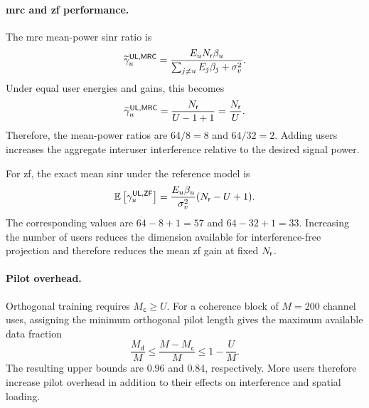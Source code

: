 \paragraph{\ac{mrc} and \ac{zf} performance.}
The \ac{mrc} mean-power \ac{sinr} ratio is
\begin{equation*}
	\widetilde\gamma_u^{\mathsf{UL},\mathsf{MRC}}
	=\frac{E_uN_{\mathsf{r}}\beta_u}
	{\sum_{j\ne u}E_j\beta_j+\sigma_v^2}.
\end{equation*}
Under equal user energies and gains, this becomes
\begin{equation*}
	\widetilde\gamma_u^{\mathsf{UL},\mathsf{MRC}}
	=\frac{N_{\mathsf{r}}}{U-1+1}
	=\frac{N_{\mathsf{r}}}{U}.
\end{equation*}
Therefore, the mean-power ratios are $64/8=8$ and $64/32=2$. Adding users increases the aggregate interuser interference relative to the desired signal power.

For \ac{zf}, the exact mean \ac{sinr} under the reference model is
\begin{equation*}
	\mathbb{E}\left[\gamma_u^{\mathsf{UL},\mathsf{ZF}}\right]
	=\frac{E_u\beta_u}{\sigma_v^2}(N_{\mathsf{r}}-U+1).
\end{equation*}
The corresponding values are $64-8+1=57$ and $64-32+1=33$. Increasing the number of users reduces the dimension available for interference-free projection and therefore reduces the mean \ac{zf} gain at fixed $N_{\mathsf{r}}$.

\paragraph{Pilot overhead.}
Orthogonal training requires $M_{\mathsf c}\geq U$. For a coherence block of $M=200$ channel uses, assigning the minimum orthogonal pilot length gives the maximum available data fraction
\begin{equation*}
	\frac{M_{\mathsf d}}{M}
	\leq\frac{M-M_{\mathsf c}}{M}
	\leq1-\frac{U}{M}.
\end{equation*}
The resulting upper bounds are $0.96$ and $0.84$, respectively. More users therefore increase pilot overhead in addition to their effects on interference and spatial loading.

